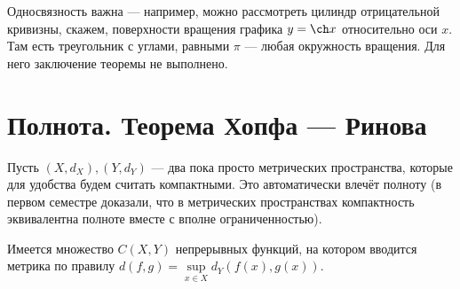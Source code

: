 \documentclass[a4paper]{report}
\begin{document}
    Односвязность важна --- например, можно рассмотреть цилиндр отрицательной кривизны, скажем, поверхности вращения графика $y = \ch x$ относительно оси $x$.
    Там есть треугольник с углами, равными $\pi$ --- любая окружность вращения.
    Для него заключение теоремы не выполнено.
    \section{Полнота. Теорема Хопфа --- Ринова}
    Пусть $(X, d_X), (Y, d_Y)$ --- два пока просто метрических пространства, которые для удобства будем считать компактными.
    Это автоматически влечёт полноту (в первом семестре доказали, что в метрических пространствах компактность эквивалентна полноте вместе с вполне ограниченностью).

    Имеется множество $C(X, Y)$ непрерывных функций, на котором вводится метрика по правилу $d(f, g) = \sup\limits_{x \in X}d_Y(f(x), g(x))$.
\end{document}
